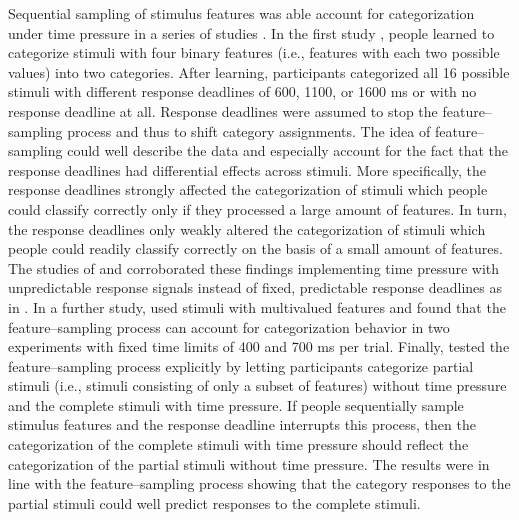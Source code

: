 \documentclass[a4paper,man,natbib]{apa6}
\begin{document}
Sequential sampling of stimulus features was able account for categorization under time pressure in a series of studies \citep{lamberts1995categorization, lamberts1998time, lamberts1999building, lamberts1999categorization, lamberts1997fast}. In the first study \citep{lamberts1995categorization}, people learned to categorize stimuli with four binary features (i.e., features with each two possible values) into two categories. After learning, participants categorized all 16 possible stimuli with different response deadlines of 600, 1100, or 1600 ms or with no response deadline at all. Response deadlines were assumed to stop the feature--sampling process and thus to shift category assignments. The idea of feature--sampling could well describe the data and especially account for the fact that the response deadlines had differential effects across stimuli. More specifically, the response deadlines strongly affected the categorization of stimuli which people could classify correctly only if they processed a large amount of features. In turn, the response deadlines only weakly altered the categorization of stimuli which people could readily classify correctly on the basis of a small amount of features. The studies of \cite{lamberts1998time} and \cite{lamberts1999categorization} corroborated these findings implementing time pressure with unpredictable response signals instead of fixed, predictable response deadlines as in \cite{lamberts1995categorization}. In a further study, \cite{lamberts1997fast} used stimuli with multivalued features and found that the feature--sampling process can account for categorization behavior in two experiments with fixed time limits of 400 and 700 ms per trial. Finally, \cite{lamberts1999building} tested the feature--sampling process explicitly by letting participants categorize partial stimuli (i.e., stimuli consisting of only a subset of features) without time pressure and the complete stimuli with time pressure. If people sequentially sample stimulus features and the response deadline interrupts this process, then the categorization of the complete stimuli with time pressure should reflect the categorization of the partial stimuli without time pressure. The results were in line with the feature--sampling process showing that the category responses to the partial stimuli could well predict responses to the complete stimuli.
\end{document}
